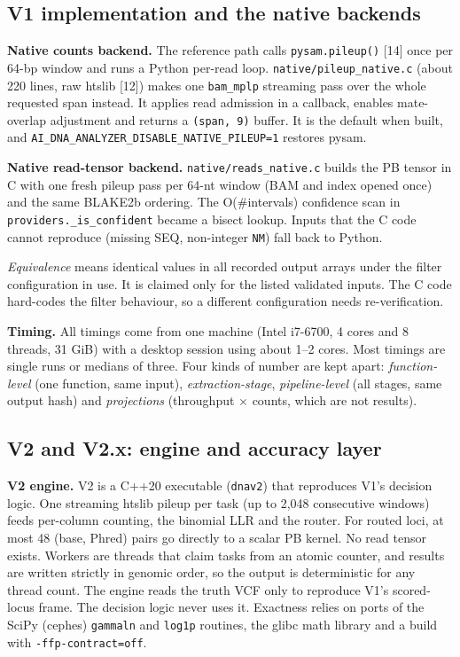\documentclass[11pt,a4paper]{article}
\makeatletter
\newcommand{\needspace}[1]{\par\ifdim\pagegoal=\maxdimen\else\dimen@=\pagegoal\advance\dimen@-\pagetotal\ifdim\dimen@<#1\relax\newpage\fi\fi}
\makeatother
\begin{document}
\needspace{6\baselineskip}
\subsection{\texorpdfstring{V1 implementation and the native backends}{V1 implementation and the native backends}}
\textbf{Native counts backend.} The reference path calls \texttt{pysam.\allowbreak{}pileup()} [14] once per 64-bp window and runs a Python per-read loop. \texttt{native/\allowbreak{}pileup\_\allowbreak{}native.\allowbreak{}c} (about 220 lines, raw htslib [12]) makes one \texttt{bam\_\allowbreak{}mplp} streaming pass over the whole requested span instead. It applies read admission in a callback, enables mate-overlap adjustment and returns a \texttt{(span, 9)} buffer. It is the default when built, and \texttt{AI\_\allowbreak{}DNA\_\allowbreak{}ANALYZER\_\allowbreak{}DISABLE\_\allowbreak{}NATIVE\_\allowbreak{}PILEUP=1} restores pysam.

\textbf{Native read-tensor backend.} \texttt{native/\allowbreak{}reads\_\allowbreak{}native.\allowbreak{}c} builds the PB tensor in C with one fresh pileup pass per 64-nt window (BAM and index opened once) and the same BLAKE2b ordering. The O(\#intervals) confidence scan in \texttt{providers.\allowbreak{}\_\allowbreak{}is\_\allowbreak{}confident} became a bisect lookup. Inputs that the C code cannot reproduce (missing SEQ, non-integer \texttt{NM}) fall back to Python.

\emph{Equivalence} means identical values in all recorded output arrays under the filter configuration in use. It is claimed only for the listed validated inputs. The C code hard-codes the filter behaviour, so a different configuration needs re-verification.

\textbf{Timing.} All timings come from one machine (Intel i7-6700, 4 cores and 8 threads, 31 GiB) with a desktop session using about 1--2 cores. Most timings are single runs or medians of three. Four kinds of number are kept apart: \emph{function-level} (one function, same input), \emph{extraction-stage}, \emph{pipeline-level} (all stages, same output hash) and \emph{projections} (throughput $\times$ counts, which are not results).

\needspace{6\baselineskip}
\subsection{\texorpdfstring{V2 and V2.x: engine and accuracy layer}{V2 and V2.x: engine and accuracy layer}}
\textbf{V2 engine.} V2 is a C++20 executable (\texttt{dnav2}) that reproduces V1's decision logic. One streaming htslib pileup per task (up to 2,048 consecutive windows) feeds per-column counting, the binomial LLR and the router. For routed loci, at most 48 (base, Phred) pairs go directly to a scalar PB kernel. No read tensor exists. Workers are threads that claim tasks from an atomic counter, and results are written strictly in genomic order, so the output is deterministic for any thread count. The engine reads the truth VCF only to reproduce V1's scored-locus frame. The decision logic never uses it. Exactness relies on ports of the SciPy (cephes) \texttt{gammaln} and \texttt{log1p} routines, the glibc math library and a build with \texttt{-ffp-contract=off}.
\end{document}

